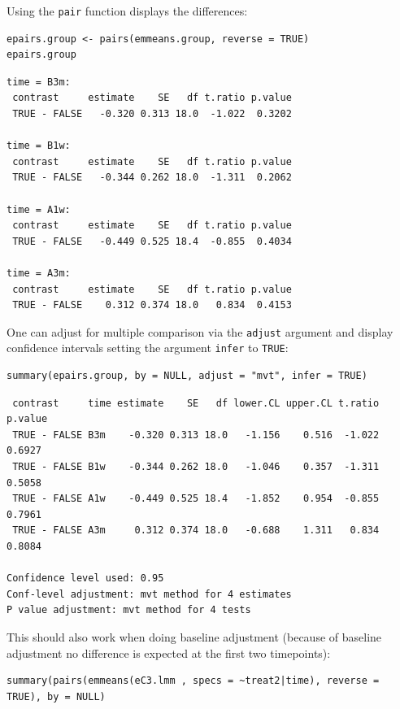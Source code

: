 \documentclass[12pt]{article}
\begin{document}
\clearpage

Using the \texttt{pair} function displays the differences:
\lstset{language=r,label= ,caption= ,captionpos=b,numbers=none}
\begin{lstlisting}
epairs.group <- pairs(emmeans.group, reverse = TRUE)
epairs.group
\end{lstlisting}

\begin{verbatim}
time = B3m:
 contrast     estimate    SE   df t.ratio p.value
 TRUE - FALSE   -0.320 0.313 18.0  -1.022  0.3202

time = B1w:
 contrast     estimate    SE   df t.ratio p.value
 TRUE - FALSE   -0.344 0.262 18.0  -1.311  0.2062

time = A1w:
 contrast     estimate    SE   df t.ratio p.value
 TRUE - FALSE   -0.449 0.525 18.4  -0.855  0.4034

time = A3m:
 contrast     estimate    SE   df t.ratio p.value
 TRUE - FALSE    0.312 0.374 18.0   0.834  0.4153
\end{verbatim}

One can adjust for multiple comparison via the \texttt{adjust} argument and
display confidence intervals setting the argument \texttt{infer} to \texttt{TRUE}:
\lstset{language=r,label= ,caption= ,captionpos=b,numbers=none}
\begin{lstlisting}
summary(epairs.group, by = NULL, adjust = "mvt", infer = TRUE)
\end{lstlisting}

\begin{verbatim}
 contrast     time estimate    SE   df lower.CL upper.CL t.ratio p.value
 TRUE - FALSE B3m    -0.320 0.313 18.0   -1.156    0.516  -1.022  0.6927
 TRUE - FALSE B1w    -0.344 0.262 18.0   -1.046    0.357  -1.311  0.5058
 TRUE - FALSE A1w    -0.449 0.525 18.4   -1.852    0.954  -0.855  0.7961
 TRUE - FALSE A3m     0.312 0.374 18.0   -0.688    1.311   0.834  0.8084

Confidence level used: 0.95 
Conf-level adjustment: mvt method for 4 estimates 
P value adjustment: mvt method for 4 tests
\end{verbatim}


This should also work when doing baseline adjustment (because of
baseline adjustment no difference is expected at the first two
timepoints):
\lstset{language=r,label= ,caption= ,captionpos=b,numbers=none}
\begin{lstlisting}
summary(pairs(emmeans(eC3.lmm , specs = ~treat2|time), reverse = TRUE), by = NULL)
\end{lstlisting}
\end{document}

